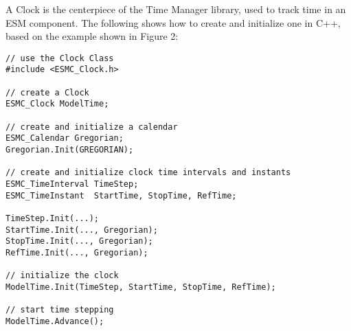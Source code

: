 
A Clock is the centerpiece of the Time Manager library, used to track time
in an ESM component.  The following shows how to create and initialize one
in C++, based on the example shown in Figure 2:

\begin{verbatim}
// use the Clock Class
#include <ESMC_Clock.h>

// create a Clock
ESMC_Clock ModelTime;

// create and initialize a calendar
ESMC_Calendar Gregorian;
Gregorian.Init(GREGORIAN);

// create and initialize clock time intervals and instants
ESMC_TimeInterval TimeStep;
ESMC_TimeInstant  StartTime, StopTime, RefTime;

TimeStep.Init(...);
StartTime.Init(..., Gregorian);
StopTime.Init(..., Gregorian);
RefTime.Init(..., Gregorian);

// initialize the clock
ModelTime.Init(TimeStep, StartTime, StopTime, RefTime);

// start time stepping
ModelTime.Advance();
\end{verbatim}
